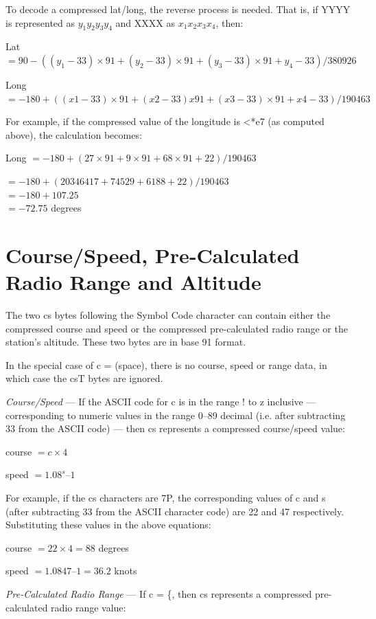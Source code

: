 To decode a compressed lat/long, the reverse process is needed. That
is, if YYYY is represented as $y_{1}y_{2}y_{3}y_{4}$ and XXXX as
$x_{1}x_{2}x_{3}x_{4}$, then:


Lat $ = 90 - ((y_{1}-33) \times 91 + (y_{2}-33) \times 91 + (y_{3}-33) \times 91 + y_{4}-33) / 380926 $

Long $ = -180 + ((x1-33) \times 91 + (x2-33) x 91 + (x3-33) \times 91 + x4-33) / 190463 $

For example, if the compressed value of the longitude is <*e7 (as computed
above), the calculation becomes:


Long $ = -180 + (27 \times 91 + 9 \times 91 + 68 \times 91 + 22) / 190463 $

$ = -180 + (20346417 + 74529 + 6188 + 22) / 190463 $ \\
$ = -180 + 107.25 $ \\
$ = -72.75 $ degrees 

\section {Course/Speed, Pre-Calculated Radio Range and Altitude}

The two cs bytes following the Symbol Code character can contain either
the compressed course and speed or the compressed pre-calculated radio
range or the station’s altitude. These two bytes are in base 91 format.

In the special case of c = \textvisiblespace (space), there is no
course, speed or range data, in which case the csT bytes are ignored.

{\em Course/Speed} — If the ASCII code for c is in the range ! to z
inclusive — corresponding to numeric values in the range 0–89 decimal
(i.e. after subtracting 33 from the ASCII code) — then cs represents a
compressed course/speed value:


course $ = c \times 4 $

speed $ = 1.08^{s} – 1 $

For example, if the cs characters are 7P, the corresponding values of
c and s (after subtracting 33 from the ASCII character code) are 22
and 47 respectively. Substituting these values in the above equations:

course $ = 22 \times 4 = 88 $ degrees

speed $ = 1.0847 – 1 = 36.2 $ knots

{\em Pre-Calculated Radio Range} — If c = \{, then cs represents a
compressed pre-calculated radio range value:
  
